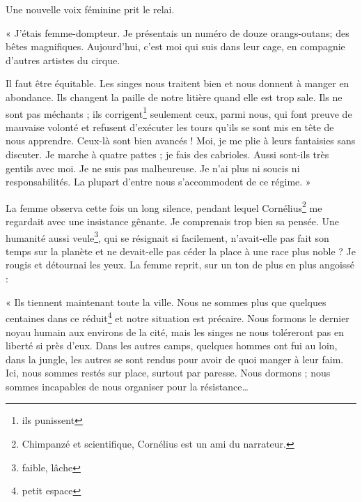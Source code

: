 	{
	
Une nouvelle voix féminine prit le relai.

« J’étais femme-dompteur. Je présentais un numéro de douze orangs-outans; des bêtes magnifiques. Aujourd’hui, c’est moi qui suis dans leur cage, en compagnie d’autres artistes du cirque.

Il faut être équitable. Les singes nous traitent bien et nous donnent à manger en abondance. Ils changent la paille de notre litière quand elle est trop sale. Ils ne sont pas méchants ; ils corrigent\footnote{ils punissent} seulement ceux, parmi nous, qui font preuve de mauvaise volonté et refusent d’exécuter les tours qu’ils se sont mis en tête de nous apprendre. Ceux-là sont bien avancés ! Moi, je me plie à leurs fantaisies sans discuter. Je marche à quatre pattes ; je fais des cabrioles. Aussi sont-ils très gentils avec moi. Je ne suis pas malheureuse. Je n’ai plus ni soucis ni responsabilités. La plupart d’entre nous s’accommodent de ce régime. »

La femme observa cette fois un long silence, pendant lequel Cornélius\footnote{Chimpanzé et scientifique, Cornélius est un ami du narrateur.} me regardait avec une insistance gênante. Je comprenais trop bien sa pensée. Une humanité aussi veule\footnote{faible, lâche}, qui se résignait si facilement, n’avait-elle pas fait son temps sur la planète et ne devait-elle pas céder la place à une race plus noble ? Je rougis et détournai les yeux. La femme reprit, sur un ton de plus en plus angoissé :

« Ils tiennent maintenant toute la ville. Nous ne sommes plus que quelques centaines dans ce réduit\footnote{petit espace} et notre situation est précaire. Nous formons le dernier noyau humain aux environs de la cité, mais les singes ne nous toléreront pas en liberté si près d’eux. Dans les autres camps, quelques hommes ont fui au loin, dans la jungle, les autres se sont rendus pour avoir de quoi manger à leur faim. Ici, nous sommes restés sur place, surtout par paresse. Nous dormons ; nous sommes incapables de nous organiser pour la résistance…

}
